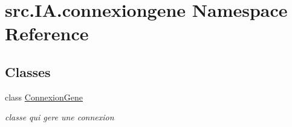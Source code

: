 \hypertarget{namespacesrc_1_1_i_a_1_1connexiongene}{}\section{src.\+I\+A.\+connexiongene Namespace Reference}
\label{namespacesrc_1_1_i_a_1_1connexiongene}
\subsection*{Classes}
\begin{DoxyCompactItemize}
\item 
class \hyperlink{classsrc_1_1_i_a_1_1connexiongene_1_1_connexion_gene}{Connexion\+Gene}
\begin{DoxyCompactList}\small\item\em classe qui gere une connexion \end{DoxyCompactList}\end{DoxyCompactItemize}
